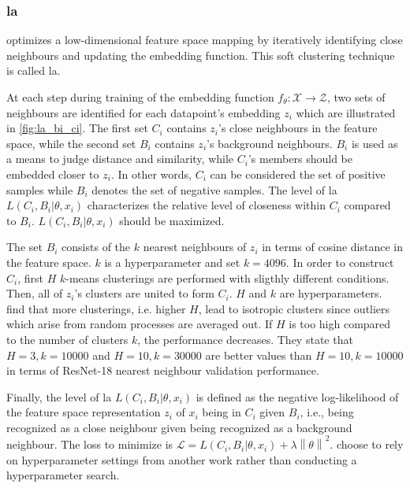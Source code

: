 \subsubsection{\acl{la}}\label{subsec:local_aggregation}


\citet{local_aggr_2019} optimizes a low-dimensional feature space mapping by 
iteratively identifying close neighbours and updating the embedding function.
This soft clustering technique is called \ac{la}.

At each step during training of the embedding function $f_\theta: \mathcal{X} \rightarrow \mathcal{Z}$, 
two sets of neighbours are identified for each datapoint's embedding $z_i$ 
which are illustrated in \autoref{fig:la_bi_ci}.
The first set $C_i$ contains $z_i$'s close neighbours in the feature space, while
the second set $B_i$ contains $z_i$'s background neighbours.
$B_i$ is used as a means to judge distance and similarity, 
while $C_i$'s members should be embedded closer to $z_i$.
In other words, $C_i$ can be considered the set of positive samples while 
$B_i$ denotes the set of negative samples.
The level of \ac{la} $L(C_i,B_i | \theta, x_i)$ 
characterizes the relative level of closeness within $C_i$ compared to $B_i$.
$L(C_i,B_i | \theta, x_i)$ should be maximized.

The set $B_i$ consists of the $k$ nearest neighbours of $z_i$ in terms of cosine distance 
in the feature space.
$k$ is a hyperparameter and \citet{local_aggr_2019} set $k=4096$.
In order to construct $C_i$, 
first $H$ $k$-means clusterings are performed with sligthly different conditions.
Then, all of $z_i$'s clusters are united to form $C_i$.
$H$ and $k$ are hyperparameters.
\citet{local_aggr_2019} find that more clusterings, i.e. higher $H$, lead to isotropic clusters since outliers which arise from random processes are averaged out.
If $H$ is too high compared to the number of clusters $k$, the performance decreases.
They state that $H=3, k=10000$ and $H=10, k=30000$ are better values than $H=10, k=10000$ 
in terms of ResNet-18 nearest neighbour validation performance.

Finally, the level of \ac{la} $L(C_i,B_i | \theta, x_i)$ is defined as the negative log-likelihood 
of the feature space representation $z_i$ of $x_i$ being in $C_i$ given $B_i$, 
i.e., being recognized as a close neighbour given being recognized as a background neighbour.
The loss to minimize is $\mathcal{L} = L(C_i,B_i | \theta, x_i) + \lambda \left\| \theta \right\|^2$.
\citet{local_aggr_2019} choose to rely on hyperparameter settings from another work rather than conducting a hyperparameter search.

